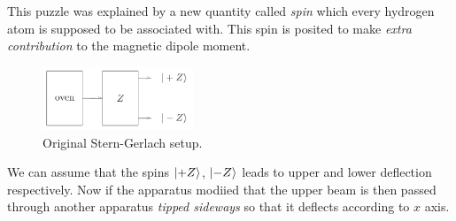 This puzzle was explained by a new quantity called \textit{spin} which every hydrogen atom is supposed to be associated with. This spin is posited to make \textit{extra contribution} to the magnetic dipole moment.
\begin{figure}[H]
    \centering
    \includegraphics[width=0.4\textwidth]{images/stern_gerlach.png}
    \caption{Original Stern-Gerlach setup.}
    \label{fig:stern-gerlach}
\end{figure}
We can assume that the spins $\ket{+Z}$, $\ket{-Z}$ leads to upper and lower deflection respectively. Now if the apparatus modiied that the upper beam is then passed through another apparatus \textit{tipped sideways} so that it deflects according to $\hat{x}$ axis.

